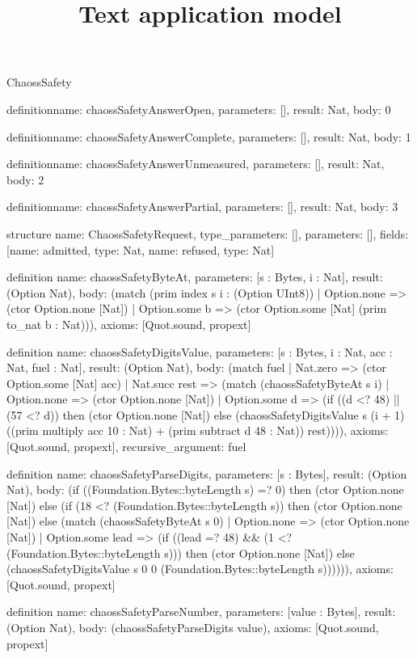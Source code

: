 \begin{lexlean}{ChaossSafety}
\title{Text application model}
\begin{semanticmodule}
definition{name: chaossSafetyAnswerOpen, parameters: [], result: Nat, body: 0}

definition{name: chaossSafetyAnswerComplete, parameters: [], result: Nat, body: 1}

definition{name: chaossSafetyAnswerUnmeasured, parameters: [], result: Nat, body: 2}

definition{name: chaossSafetyAnswerPartial, parameters: [], result: Nat, body: 3}

structure{
  name: ChaossSafetyRequest,
  type_parameters: [],
  parameters: [],
  fields: [{name: admitted, type: Nat}, {name: refused, type: Nat}]
}

definition{
  name: chaossSafetyByteAt,
  parameters: [s : Bytes, i : Nat],
  result: (Option Nat),
  body: (match (prim index s i : (Option UInt8))
    | Option.none => (ctor Option.none [Nat])
    | Option.some b => (ctor Option.some [Nat] (prim to_nat b : Nat))),
  axioms: [Quot.sound, propext]
}

definition{
  name: chaossSafetyDigitsValue,
  parameters: [s : Bytes, i : Nat, acc : Nat, fuel : Nat],
  result: (Option Nat),
  body: (match fuel
    | Nat.zero => (ctor Option.some [Nat] acc)
    | Nat.succ rest => (match (chaossSafetyByteAt s i)
      | Option.none => (ctor Option.none [Nat])
      | Option.some d => (if ((d <? 48) || (57 <? d)) then (ctor Option.none [Nat]) else (chaossSafetyDigitsValue s (i + 1) ((prim multiply acc 10 : Nat) + (prim subtract d 48 : Nat)) rest)))),
  axioms: [Quot.sound, propext],
  recursive_argument: fuel
}

definition{
  name: chaossSafetyParseDigits,
  parameters: [s : Bytes],
  result: (Option Nat),
  body: (if ((Foundation.Bytes::byteLength s) =? 0) then (ctor Option.none [Nat]) else (if (18 <? (Foundation.Bytes::byteLength s)) then (ctor Option.none [Nat]) else (match (chaossSafetyByteAt s 0)
    | Option.none => (ctor Option.none [Nat])
    | Option.some lead => (if ((lead =? 48) && (1 <? (Foundation.Bytes::byteLength s))) then (ctor Option.none [Nat]) else (chaossSafetyDigitsValue s 0 0 (Foundation.Bytes::byteLength s)))))),
  axioms: [Quot.sound, propext]
}

definition{
  name: chaossSafetyParseNumber,
  parameters: [value : Bytes],
  result: (Option Nat),
  body: (chaossSafetyParseDigits value),
  axioms: [Quot.sound, propext]
}


\end{semanticmodule}
\end{lexlean}
